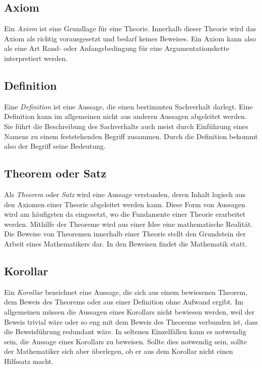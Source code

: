 \subsection{Axiom}

Ein \textsl{Axiom} ist eine Grundlage für eine Theorie. Innerhalb dieser Theorie wird das Axiom als richtig vorausgesetzt und bedarf keines Beweises. Ein Axiom kann also als eine Art Rand- oder Anfangsbedingung für eine Argumentationskette interpretiert werden.

\subsection{Definition}

Eine \textsl{Definition} ist eine Aussage, die einen bestimmten Sachverhalt darlegt. Eine Definition kann im allgemeinen nicht aus anderen Aussagen abgeleitet werden. Sie führt die Beschreibung des Sachverhalts auch meist durch Einführung eines Namens zu einem feststehenden Begriff zusammen. Durch die Definition bekommt also der Begriff seine Bedeutung.

\subsection{Theorem oder Satz}

Als \textsl{Theorem} oder \textsl{Satz} wird eine Aussage verstanden, deren Inhalt logisch aus den Axiomen einer Theorie abgeleitet werden kann. Diese Form von Aussagen wird am häufigsten da eingesetzt, wo die Fundamente einer Theorie erarbeitet werden. Mithilfe der Theoreme wird aus einer Idee eine mathematische Realität. Die Beweise von Theoremen innerhalb einer Theorie stellt den Grundstein der Arbeit eines Mathematikers dar. In den Beweisen findet die Mathematik statt.

\subsection{Korollar}

Ein \textsl{Korollar} bezeichnet eine Aussage, die sich aus einem bewiesenen Theorem, dem Beweis des Theorems oder aus einer Definition ohne Aufwand ergibt. Im allgemeinen müssen die Aussagen eines Korollars nicht bewiesen werden, weil der Beweis trivial wäre oder so eng mit dem Beweis des Theorems verbunden ist, dass die Beweisführung redundant wäre. In seltenen Einzelfällen kann es notwendig sein, die Aussage eines Korollars zu beweisen. Sollte dies notwendig sein, sollte der Mathematiker sich aber überlegen, ob er aus dem Korollar nicht einen Hilfssatz macht.

